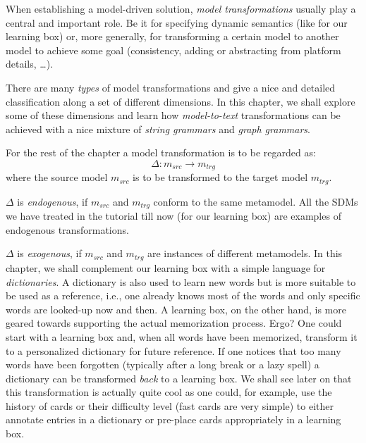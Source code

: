 \genHeader

When establishing a model-driven solution, \emph{model transformations} usually play a central and important role.
Be it for specifying dynamic semantics (like for our learning box) or, more generally, for transforming a certain model to another model to achieve some goal (consistency, adding or abstracting from platform details, \ldots).  

There are many \emph{types} of model transformations and \cite{CH03,Mens_Gorp_2006} give a nice and detailed classification along a set of different dimensions. 
In this chapter, we shall explore some of these dimensions and learn how \emph{model-to-text} transformations can be achieved with a nice mixture of \emph{string grammars} and \emph{graph grammars}. 

For the rest of the chapter a model transformation is to be regarded as:
\begin{displaymath}
 	\Delta: m_{src} \rightarrow m_{trg}
\end{displaymath}
where the source model $m_{src}$ is to be transformed to the target model $m_{trg}$.

$\Delta$ is \emph{endogenous}, if $m_{src}$ and $m_{trg}$ conform to the same metamodel.
All the SDMs we have treated in the tutorial till now (for our learning box) are examples of endogenous transformations.

$\Delta$ is \emph{exogenous}, if $m_{src}$ and $m_{trg}$ are instances of different metamodels.
In this chapter, we shall complement our learning box with a simple language for \emph{dictionaries}.
A dictionary is also used to learn new words but is more suitable to be used as a reference, i.e., one already knows most of the words and only specific words are looked-up now and then.
A learning box, on the other hand, is more geared towards supporting the actual memorization process.
Ergo?  One could start with a learning box and, when all words have been memorized, transform it to a personalized dictionary for future reference.
If one notices that too many words have been forgotten (typically after a long break or a lazy spell) a dictionary can be transformed \emph{back} to a learning box.
We shall see later on that this transformation is actually quite cool as one could, for example, use the history of cards or their difficulty level (fast cards are very simple) to either annotate entries in a dictionary or pre-place cards appropriately in a learning box. 

